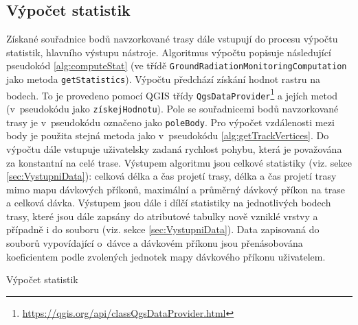 \subsection{Výpočet statistik}
\label{subsec:vypocetStatistik} Získané souřadnice bodů navzorkované
trasy dále vstupují do procesu výpočtu statistik, hlavního výstupu
nástroje. Algoritmus výpočtu popisuje následující pseudokód
\ref{alg:computeStat} (ve třídě
\texttt{GroundRadiationMonitoringComputation} jako metoda
\texttt{getStatistics}). Výpočtu předchází získání hodnot rastru na
bodech. To je provedeno pomocí QGIS třídy
\texttt{QgsDataProvider}\footnote{\url{https://qgis.org/api/classQgsDataProvider.html}}
a jejích metod (v~pseudokódu jako \texttt{získejHodnotu}). Pole se
souřadnicemi bodů navzorkované trasy je v~pseudokódu označeno jako
\texttt{poleBody}. Pro výpočet vzdálenosti mezi body je použita stejná
metoda jako v~pseudokódu \ref{alg:getTrackVertices}. Do výpočtu dále
vstupuje uživatelsky zadaná rychlost pohybu, která je považována za
konstantní na celé trase. Výstupem algoritmu jsou celkové statistiky
(viz. sekce \ref{sec:VystupniData}): celková délka a čas projetí
trasy, délka a čas projetí trasy mimo mapu dávkových příkonů,
maximální a průměrný dávkový příkon na trase a celková dávka. Výstupem
jsou dále i dílčí statistiky na jednotlivých bodech trasy, které jsou
dále zapsány do atributové tabulky nově vzniklé vrstvy a případně i do
 souboru (viz. sekce \ref{sec:VystupniData}). Data zapisovaná
do souborů vypovídající o~dávce a dávkovém příkonu jsou přenásobována
koeficientem podle zvolených jednotek mapy dávkového příkonu
uživatelem.


\begin{algorithm}
\caption{Výpočet statistik}
\label{alg:computeStat}
	\begin{algorithmic}[1]  
 
 
 
 

		   \ELSE {}
			\ENDIF
			

  

		\end{algorithmic}
		\end{algorithm}

